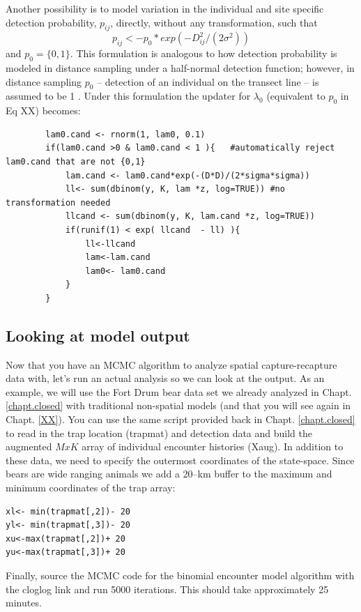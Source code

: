 Another possibility is to model variation in the individual and site specific detection probability,  $p_{ij}$, directly, without any transformation, such that
\[
p_{ij}<-p_0 * exp(-D_{ij}^2/(2\sigma^2))
\]
and $p_0 = \{0,1\}$.
This formulation is analogous to how detection probability is modeled in distance sampling under a half-normal detection function; however, in distance sampling $p_0$ -- detection of an individual on the transect line -- is assumed to be 1 \citep{buckland_etal:2001}. Under this formulation the updater for $\lambda_0$ (equivalent to $p_0$ in Eq XX) becomes:
\begin{verbatim}
        lam0.cand <- rnorm(1, lam0, 0.1)
        if(lam0.cand >0 & lam0.cand < 1 ){   #automatically reject lam0.cand that are not {0,1}
            lam.cand <- lam0.cand*exp(-(D*D)/(2*sigma*sigma))
            ll<- sum(dbinom(y, K, lam *z, log=TRUE)) #no transformation needed
            llcand <- sum(dbinom(y, K, lam.cand *z, log=TRUE))
            if(runif(1) < exp( llcand  - ll) ){
                ll<-llcand
                lam<-lam.cand
                lam0<- lam0.cand
            }
        }
\end{verbatim}


\subsection{Looking at model output}
Now that you have an MCMC algorithm to analyze spatial capture-recapture data with, let's run an actual analysis so we can look at the output. As an example, we will use the Fort Drum bear data set we already analyzed in Chapt. \ref{chapt.closed} with traditional non-spatial models (and that you will see again in Chapt. \ref{XX}). You can use the same script provided back in Chapt. \ref{chapt.closed} to read in the trap location (trapmat) and detection data and build the augmented $M x K$ array of individual encounter histories (Xaug). In addition to these data, we need to specify the outermost coordinates of the state-space. Since bears are wide ranging animals we add a 20--km buffer to the maximum and minimum coordinates of the trap array:

\begin{verbatim}
xl<- min(trapmat[,2])- 20  
yl<- min(trapmat[,3])- 20 
xu<-max(trapmat[,2])+ 20
yu<-max(trapmat[,3])+ 20
\end{verbatim}

Finally, source the MCMC code for the binomial encounter model algorithm with the cloglog link and run 5000 iterations. This should take approximately 25 minutes.

